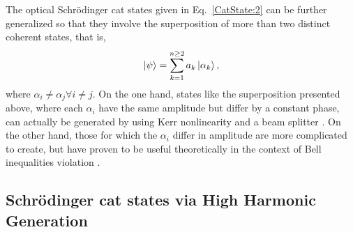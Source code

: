 The optical Schrödinger cat states given in Eq.~\eqref{CatState:2} can be further generalized so that they involve the superposition of more than two distinct coherent states, that is,
\begin{equation}\label{Generalized:Cat}
    \ket{\psi} = 
        \sum^{n\geq2}_{k=1} a_k \ket{\alpha_k},
\end{equation}
where $\alpha_i \neq \alpha_j \forall i\neq j$. On the one hand, states like the superposition presented above, where each $\alpha_i$ have the same amplitude but differ by a constant phase, can actually be generated by using Kerr nonlinearity and a beam splitter \cite{vanEnk2003}. On the other hand, those for which the $\alpha_i$ differ in amplitude are more complicated to create, but have proven to be useful theoretically in the context of Bell inequalities violation \cite{Wenger2003}.

\subsection{Schrödinger cat states via High Harmonic Generation}

